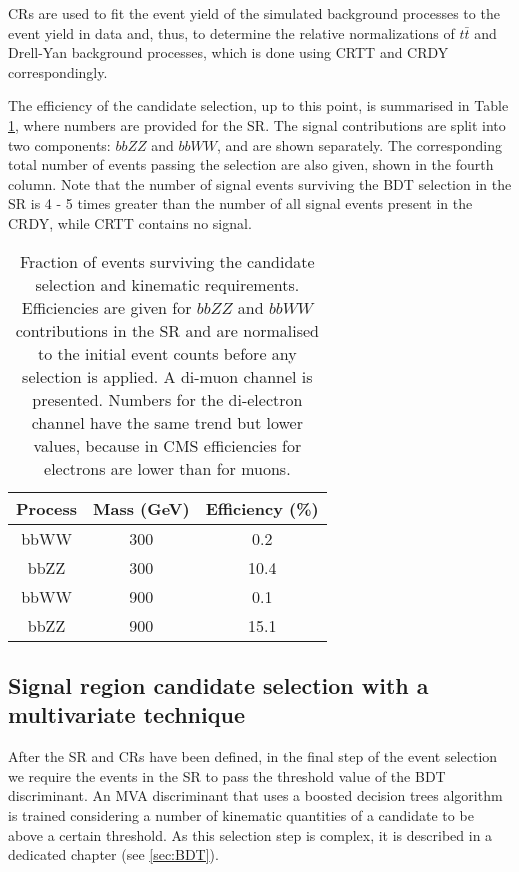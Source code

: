 CRs are used to fit the event yield of the simulated background processes to the event yield in data and, thus, to determine the relative normalizations of $t\bar{t}$ and Drell-Yan background processes, which is done using CRTT and CRDY correspondingly. 

The efficiency of the candidate selection, up to this point, is summarised in Table \ref{eff_upto_bdt}, where numbers are provided for the SR. The signal contributions are split into two components: $bbZZ$ and $bbWW$, and are shown separately. The corresponding total number of events passing the selection are also given, shown in the fourth column. Note that the number of signal events surviving the BDT selection in the SR is 4 - 5 times greater than the number of all signal events present in the CRDY, while CRTT contains no signal. 

\begin{table}
\begin{center}
\caption{Fraction of events surviving the candidate selection and kinematic requirements. Efficiencies are given for $bbZZ$ and $bbWW$ contributions in the SR and are normalised to the initial event counts before any selection is applied. A di-muon channel is presented. Numbers for the di-electron channel have the same trend but lower values, because in CMS efficiencies for electrons are lower than for muons.}
\begin{tabular}{ |c|c|c| } \hline
{Process} & Mass (GeV) & Efficiency (\%)  \\\hline
bbWW & 300 & 0.2 \\
bbZZ & 300 & 10.4 \\\hline
bbWW & 900 & 0.1 \\
bbZZ & 900 & 15.1 \\\hline
\end{tabular}
\label{eff_upto_bdt}
\end{center}
\end{table}

\subsection{Signal region candidate selection with a multivariate technique}

After the SR and CRs have been defined, in the final step of the event selection we require the events in the SR to pass the threshold value of the BDT discriminant. An MVA discriminant that uses a boosted decision trees algorithm is trained considering a number of kinematic quantities of a candidate to be above a certain threshold. As this selection step is complex, it is described in a dedicated chapter (see \ref{sec:BDT}).

